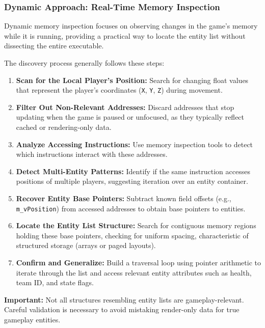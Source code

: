 \begin{tcolorbox}[colback=gray!03, colframe=black!15, sharp corners, boxrule=0.3mm, width=\textwidth]

    \subsubsection*{Dynamic Approach: Real-Time Memory Inspection}
    
    Dynamic memory inspection focuses on observing changes in the game’s memory while it is running, providing a practical way to locate the entity list without dissecting the entire executable.
    
    The discovery process generally follows these steps:
    
    \begin{enumerate}
        \item \textbf{Scan for the Local Player’s Position:}  
        Search for changing float values that represent the player's coordinates (\texttt{X}, \texttt{Y}, \texttt{Z}) during movement.
    
        \item \textbf{Filter Out Non-Relevant Addresses:}  
        Discard addresses that stop updating when the game is paused or unfocused, as they typically reflect cached or rendering-only data.
    
        \item \textbf{Analyze Accessing Instructions:}  
        Use memory inspection tools to detect which instructions interact with these addresses.
    
        \item \textbf{Detect Multi-Entity Patterns:}  
        Identify if the same instruction accesses positions of multiple players, suggesting iteration over an entity container.
    
        \item \textbf{Recover Entity Base Pointers:}  
        Subtract known field offsets (e.g., \texttt{m\_vPosition}) from accessed addresses to obtain base pointers to entities.
    
        \item \textbf{Locate the Entity List Structure:}  
        Search for contiguous memory regions holding these base pointers, checking for uniform spacing, characteristic of structured storage (arrays or paged layouts).
    
        \item \textbf{Confirm and Generalize:}  
        Build a traversal loop using pointer arithmetic to iterate through the list and access relevant entity attributes such as health, team ID, and state flags.
    \end{enumerate}
    
    
    \begin{tcolorbox}[colback=gray!07, colframe=black!30, sharp corners, boxrule=0pt]
    \textbf{Important:}  
    Not all structures resembling entity lists are gameplay-relevant. Careful validation is necessary to avoid mistaking render-only data for true gameplay entities.
    \end{tcolorbox}
    
\end{tcolorbox}
    
